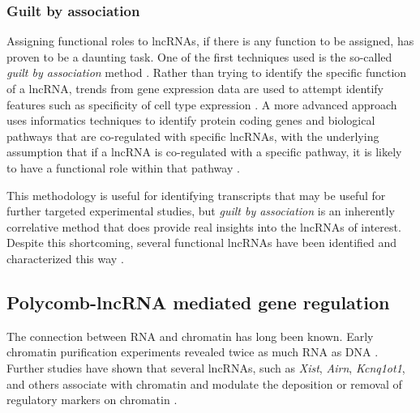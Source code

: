 \subsubsection{Guilt by association}
Assigning functional roles to lncRNAs, if there is any function to be assigned, has proven to be a daunting task. One of the first techniques used is the so-called \emph{guilt by association} method \cite{Guttman2009ChromatinMammals,Rinn2012GenomeRNAs}. Rather than trying to identify the specific function of a lncRNA, trends from gene expression data are used to attempt identify features such as specificity of cell type expression \cite{Mercer2008SpecificBrain,Perron2017InExpression,Lefever2017DecodeRNA-Guilt-by-association}. A more advanced approach uses informatics techniques to identify protein coding genes and biological pathways that are co-regulated with specific lncRNAs, with the underlying assumption that if a lncRNA is co-regulated with a specific pathway, it is likely to have a functional role within that pathway \cite{Thiel2019IdentifyingAnalysis}. 

This methodology is useful for identifying transcripts that may be useful for further targeted experimental studies, but \emph{guilt by association} is an inherently correlative method that does provide real insights into the lncRNAs of interest. Despite this shortcoming, several functional lncRNAs have been identified and characterized this way \cite{Gupta2010LongMetastasis, Broadbent2011ALncRNAs}. 


\subsection{Polycomb-lncRNA mediated gene regulation}

The connection between RNA and chromatin has long been known. Early chromatin purification experiments revealed twice as much RNA as DNA \cite{Paul1975Chromatin-associatedEuchromatin}. Further studies have shown that several lncRNAs, such as \emph{Xist}, \emph{Airn}, \emph{Kcnq1ot1}, and others associate with chromatin and modulate the deposition or removal of regulatory markers on chromatin \cite{Schertzer2019LncRNA-InducedDNA,Pandey2008Kcnq1ot1Regulation,Sleutels2002TheGenes}. 

